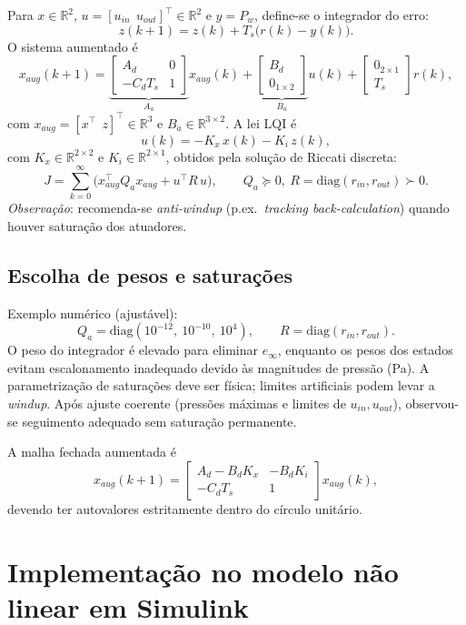 Para $x\in\mathbb{R}^2$, $u=[u_{in}\ \ u_{out}]^\top\in\mathbb{R}^2$ e $y=P_w$, define-se o integrador do erro:
\[
z(k+1)=z(k)+T_s\big(r(k)-y(k)\big).
\]
O sistema aumentado é
\[
x_{aug}(k+1)=
\underbrace{\begin{bmatrix}
A_d & 0\\
- C_d T_s & 1
\end{bmatrix}}_{A_{a}}
x_{aug}(k)
+
\underbrace{\begin{bmatrix}
B_d\\
0_{1\times 2}
\end{bmatrix}}_{B_{a}}
u(k)
+
\begin{bmatrix}
0_{2\times 1}\\
T_s
\end{bmatrix}r(k),
\]
com $x_{aug}=[x^\top\ \ z]^\top\in\mathbb{R}^3$ e $B_a\in\mathbb{R}^{3\times 2}$. A lei LQI é
\[
u(k)=-K_x\,x(k)-K_i\,z(k),
\]
com $K_x\in\mathbb{R}^{2\times 2}$ e $K_i\in\mathbb{R}^{2\times 1}$, obtidos pela solução de Riccati discreta:
\[
J=\sum_{k=0}^{\infty}\big(x_{aug}^\top Q_a x_{aug}+u^\top R\,u\big),\qquad 
Q_a\succeq 0,\ R=\mathrm{diag}(r_{in},r_{out})\succ 0.
\]
\textit{Observação}: recomenda-se \emph{anti-windup} (p.ex.\ \emph{tracking back-calculation}) quando houver saturação dos atuadores.

\subsection{Escolha de pesos e saturações}

Exemplo numérico (ajustável): 
\[
Q_a=\mathrm{diag}(10^{-12},\ 10^{-10},\ 10^{4}),\qquad
R=\mathrm{diag}(r_{in},r_{out}).
\]
O peso do integrador é elevado para eliminar $e_\infty$, enquanto os pesos dos estados evitam escalonamento inadequado devido às magnitudes de pressão (Pa). A parametrização de saturações deve ser física; limites artificiais podem levar a \emph{windup}. Após ajuste coerente (pressões máximas e limites de $u_{in},u_{out}$), observou-se seguimento adequado sem saturação permanente.

A malha fechada aumentada é
\[
x_{aug}(k+1)=
\begin{bmatrix}
A_d - B_d K_x & - B_d K_i \\
- C_d T_s & 1
\end{bmatrix}
x_{aug}(k),
\]
devendo ter autovalores estritamente dentro do círculo unitário.

\section{Implementação no modelo não linear em Simulink}
\label{sec:implementacao-simulink}

